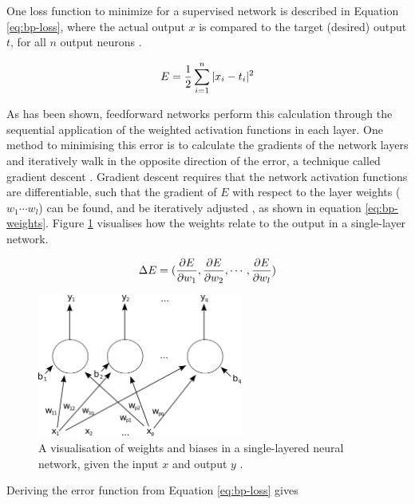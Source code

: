 \documentclass[report.tex]{subfiles}
\begin{document}
One loss function to minimize for a supervised network
is described in Equation \ref{eq:bp-loss},
where the actual output $x$ is compared to the 
target (desired) output $t$, for all $n$ output neurons
\cite{Russel2007}.

\begin{equation}
  E = {1 \over 2} \sum_{i=1}^n |x_i - t_i|^2
  \label{eq:bp-loss}
\end{equation}

As has been shown, feedforward networks perform this calculation
through the sequential application of the weighted activation
functions in each layer.
One method to minimising this error is
to calculate the gradients of the network layers and iteratively walk in
the opposite direction of the error, a technique called gradient
descent \cite{Rumelhart1988, Russel2007}.
Gradient descent requires that the network
activation functions are differentiable,
such that the gradient of $E$ with respect to the layer weights
($w_1 \cdots w_l$) can be found, and be iteratively
adjusted \cite{Rojas1996}, as shown in equation \ref{eq:bp-weights}.
Figure \ref{fig:ann_weights} visualises how the weights relate
to the output in a single-layer network.

\begin{equation}
  \Delta E = (
    {\partial E \over \partial w_1}, 
    {\partial E \over \partial w_2},
    \cdots, 
    {\partial E \over \partial w_l}
  )
  \label{eq:bp-weights}
\end{equation}

\begin{figure}
  \centering
  \includegraphics[width=0.6\textwidth]{images/ann.png}
  \caption{A visualisation of weights and biases in a single-layered neural
  network, given the input $x$ and output $y$ \cite{Mcstrother}.}
  \label{fig:ann_weights}
\end{figure}

Deriving the error function from Equation \ref{eq:bp-loss} gives
\end{document}
